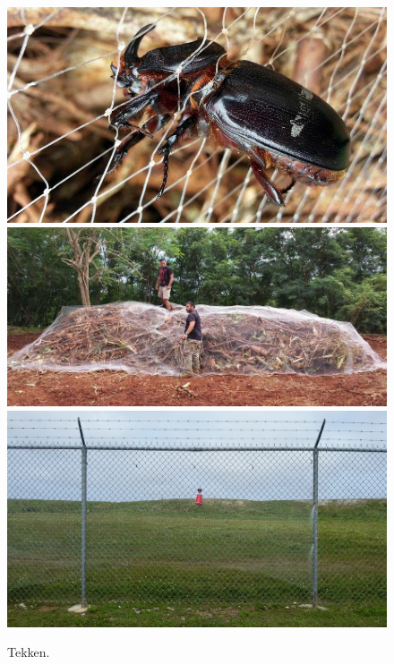 \documentclass[twocolumn,letterpaper]{scrartcl}
\begin{document}
\begin{figure}[h]
	\centering
	\includegraphics[width=\linewidth]{images/tekken-beetle}
	\includegraphics[width=\linewidth]{images/tekken-pile}
	\includegraphics[width=\linewidth]{images/defence-trap}
	\caption{Tekken.}
	\label{fig:tekken-beetle}
\end{figure}
\end{document}

